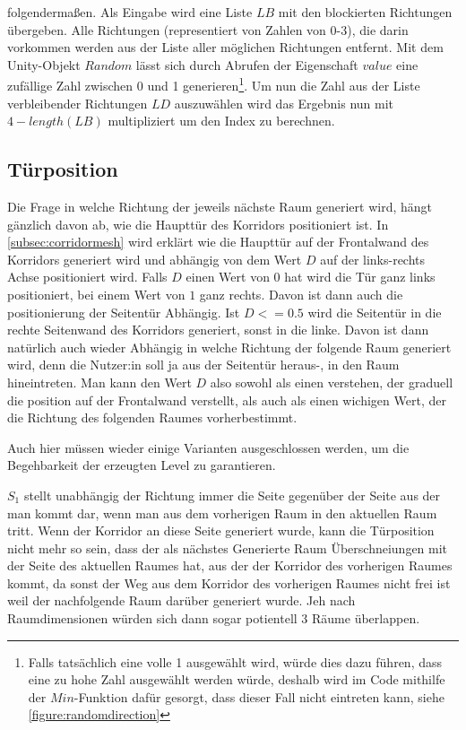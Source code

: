 folgendermaßen. Als Eingabe wird eine Liste $LB$ mit den blockierten Richtungen übergeben. Alle Richtungen (representiert von Zahlen von 0-3), die darin vorkommen werden aus der Liste aller möglichen Richtungen entfernt.
Mit dem Unity-Objekt $Random$ lässt sich durch Abrufen der Eigenschaft $value$ eine zufällige Zahl zwischen 0 und 1 generieren\footnote{Falls tatsächlich eine volle 1 ausgewählt wird, würde dies dazu führen, dass eine zu hohe Zahl ausgewählt werden würde, deshalb wird im Code mithilfe der $Min$-Funktion dafür gesorgt, dass dieser Fall nicht eintreten kann, siehe \autoref{figure:randomdirection}}.
Um nun die Zahl aus der Liste verbleibender Richtungen $LD$ auszuwählen wird das Ergebnis nun mit $4 - length(LB)$ multipliziert um den Index zu berechnen.

\subsection{Türposition}
Die Frage in welche Richtung der jeweils nächste Raum generiert wird, hängt gänzlich davon ab, wie die Haupttür des Korridors positioniert ist. In \autoref{subsec:corridormesh} wird erklärt wie die Haupttür auf der Frontalwand des Korridors generiert wird und abhängig von dem Wert $D$ auf der links-rechts Achse positioniert wird.
Falls $D$ einen Wert von $0$ hat wird die Tür ganz links positioniert, bei einem Wert von $1$ ganz rechts. Davon ist dann auch die positionierung der Seitentür Abhängig. Ist $D <= 0.5$ wird die Seitentür in die rechte Seitenwand des Korridors generiert, sonst in die linke.
Davon ist dann natürlich auch wieder Abhängig in welche Richtung der folgende Raum generiert wird, denn die Nutzer:in soll ja aus der Seitentür heraus-, in den Raum hineintreten.
Man kann den Wert $D$ also sowohl als einen verstehen, der graduell %
die position auf der Frontalwand verstellt, als auch als einen wichigen Wert, der die Richtung des folgenden Raumes vorherbestimmt.

Auch hier müssen wieder einige Varianten ausgeschlossen werden, um die Begehbarkeit der erzeugten Level zu garantieren.

$S_1$ stellt unabhängig der Richtung immer die Seite gegenüber der Seite aus der man kommt dar, wenn man aus dem vorherigen Raum in den aktuellen Raum tritt.
Wenn der Korridor an diese Seite generiert wurde, kann die Türposition nicht mehr so sein, dass der als nächstes Generierte Raum Überschneiungen mit der Seite des aktuellen Raumes hat, aus der der Korridor des vorherigen Raumes kommt, da sonst der Weg aus dem Korridor des vorherigen Raumes nicht frei ist weil der nachfolgende Raum darüber generiert wurde. Jeh nach Raumdimensionen würden sich dann sogar potientell 3 Räume überlappen.

